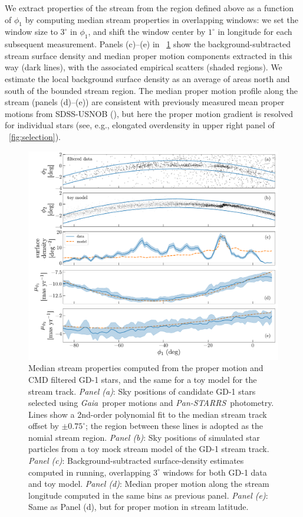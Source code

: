\documentclass[modern]{aastex62}
\newcommand{\gaia}{\textsl{Gaia}}
\newcommand{\pans}{\textsl{Pan-STARRS}}
\begin{document}
We extract properties of the stream from the region defined above as a function
of $\phi_1$ by computing median stream properties in overlapping windows:
we set the window size to $3^\circ$ in $\phi_1$, and shift the window center by
$1^\circ$ in longitude for each subsequent measurement.
Panels (c)--(e) in \figurename~\ref{fig:track-and-model} show the
background-subtracted stream surface density and median proper motion components
extracted in this way (dark lines), with the associated empirical scatters
(shaded regions).
We estimate the local background surface density as an average of areas north
and south of the bounded stream region.
The median proper motion profile along the stream (panels (d)--(e)) are
consistent with previously measured mean proper motions from SDSS-USNOB
(\citealt{Koposov:2010}), but here the proper motion gradient is resolved for
individual stars (see, e.g., elongated overdensity in upper right panel of
\figurename~\ref{fig:selection}).

\begin{figure}
\begin{center}
\includegraphics[width=\textwidth]{track_observables.pdf}
\end{center}
\caption{%
Median stream properties computed from the proper motion and CMD filtered GD-1
stars, and the same for a toy model for the stream track.
\textit{Panel (a)}: Sky positions of candidate GD-1 stars selected using \gaia\
proper motions and \pans\ photometry.
Lines show a 2nd-order polynomial fit to the median stream track offset by $\pm
0.75^\circ$; the region between these lines is adopted as the nomial stream
region.
\textit{Panel (b)}: Sky positions of simulated star particles from a toy mock
stream model of the GD-1 stream track.
\textit{Panel (c)}: Background-subtracted surface-density estimates computed in
running, overlapping $3^\circ$ windows for both GD-1 data and toy model.
\textit{Panel (d)}: Median proper motion along the stream longitude computed in
the same bins as previous panel.
\textit{Panel (e)}: Same as Panel (d), but for proper motion in stream latitude.
}
\label{fig:track-and-model}
\end{figure}
\end{document}
